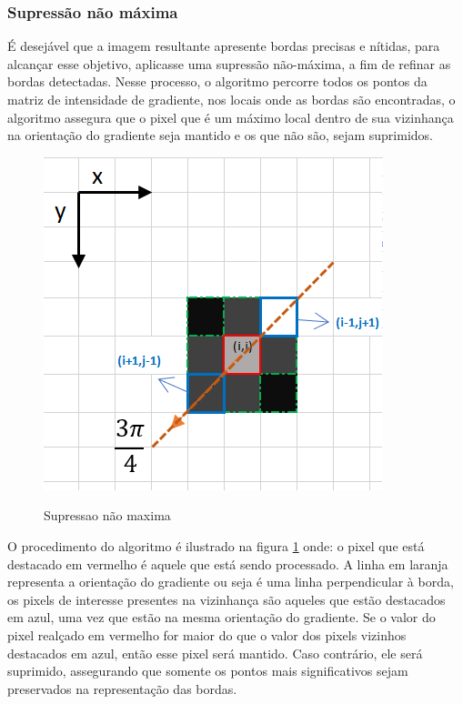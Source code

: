 \subsubsection[Supressão não máxima]{Supressão não máxima}


É desejável que a imagem resultante apresente bordas precisas e nítidas, para alcançar esse objetivo, aplicasse uma supressão não-máxima, a fim de refinar as bordas detectadas. Nesse processo, o algoritmo percorre todos os pontos da matriz de intensidade de gradiente, nos locais onde as bordas são encontradas, o algoritmo  assegura que o pixel que é um máximo local dentro de sua vizinhança na orientação do gradiente seja mantido e os que não são, sejam suprimidos\cite{canny-edge-detection-python}.



\begin{figure}[!ht]
	\centering
    \caption{Supressao não maxima}
	\includegraphics[scale=0.65]{figuras/filter/supressao_nao_maxima/supressao3.png}
	\label{fig:Supressao nao maxima}
\end{figure}


O procedimento do algoritmo é ilustrado na figura \ref{fig:Supressao nao maxima} onde: o pixel que está destacado em vermelho é aquele que está sendo processado. A linha em laranja representa a orientação do gradiente ou seja é uma linha perpendicular à borda, os pixels de interesse presentes na vizinhança são aqueles que estão destacados em azul, uma vez que estão na mesma orientação do gradiente. Se o valor do pixel realçado em vermelho for maior do que o valor dos pixels vizinhos destacados em azul, então esse pixel será mantido. Caso contrário, ele será suprimido, assegurando que somente os pontos mais significativos sejam preservados na representação das bordas\cite{canny-edge-detection-python}.




